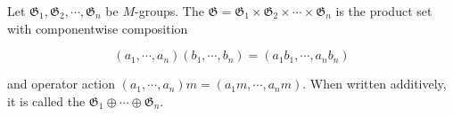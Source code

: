Let $\mathfrak{G}_1, \mathfrak{G}_2, \cdots, \mathfrak{G}_n$ be $M$-groups. The  $\mathfrak{G} = \mathfrak{G}_1 \times \mathfrak{G}_2 \times \cdots \times \mathfrak{G}_n$ is the product set with componentwise composition

$$(a_1, \cdots, a_n)(b_1, \cdots, b_n) = (a_1b_1, \cdots, a_nb_n)$$

and operator action $(a_1, \cdots, a_n)m = (a_1m, \cdots, a_nm)$. When written additively, it is called the  $\mathfrak{G}_1 \oplus \cdots \oplus \mathfrak{G}_n$.
